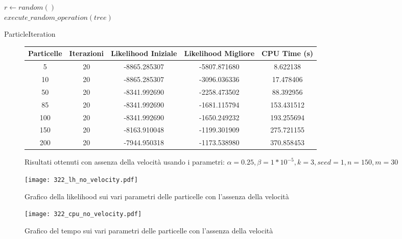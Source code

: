 \begin{algorithm}[!h]
    $r \gets random()$ \\
    $execute\_random\_operation(tree)$
    \caption{ParticleIteration}
    \label{algo:pso-adapt-calculate-1}
\end{algorithm}

\begin{figure}[!h]
  \centering
  \begin{tabular}{*{5}{c}}
    Particelle & Iterazioni & Likelihood Iniziale & Likelihood Migliore & CPU Time (s) \\ \midrule \midrule
    5 & 20 & -8865.285307 & -5807.871680 & 8.622138 \\
    10 & 20 & -8865.285307 & -3096.036336 & 17.478406 \\
    50 & 20 & -8341.992690 & -2258.473502 & 88.392956 \\
    85 & 20 & -8341.992690 & -1681.115794 & 153.431512 \\
    100 & 20 & -8341.992690 & -1650.249232 & 193.255694 \\
    150 & 20 & -8163.910048 & -1199.301909 & 275.721155 \\
    200 & 20 & -7944.950318 & -1173.538980 & 370.858453
  \end{tabular}
  \caption{Risultati ottenuti con assenza della velocità usando i parametri: $\alpha = 0.25, \beta = 1*10^{-5}, k = 3, seed = 1, n = 150, m = 30$}
  \label{fig:pso-adapt-calculate-1-table}
\end{figure}

\begin{figure}[!h]
  \centering
  \begin{minipage}{.45 \textwidth}
  \centering
  \texttt{[image: 322\_lh\_no\_velocity.pdf]}
  \caption{Grafico della likelihood sui vari parametri delle particelle con l'assenza della velocità}
  \end{minipage}
  \begin{minipage}{.45 \textwidth}
    \centering
    \texttt{[image: 322\_cpu\_no\_velocity.pdf]}
    \caption{Grafico del tempo sui vari parametri delle particelle con l'assenza della velocità}
  \end{minipage}
  \label{fig:pso-adapt-calculate-1-graph}
\end{figure}

